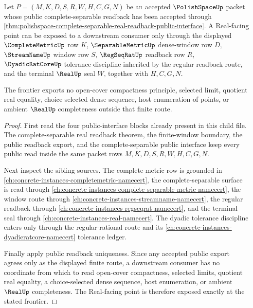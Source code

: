 \begin{theorem}
\label{thm:polishspace-public-complete-separable-real-readback-frontier}
Let $P=(M,K,D,S,R,W,H,C,G,N)$ be an accepted $\PolishSpaceUp$ packet whose public complete-separable readback has been accepted through \autoref{thm:polishspace-complete-separable-real-readback-public-interface}. A Real-facing point can be exposed to a downstream consumer only through the displayed $\CompleteMetricUp$ row $K$, $\SeparableMetricUp$ dense-window row $D$, $\StreamNameUp$ window row $S$, $\RegSeqRatUp$ readback row $R$, $\DyadicRatCoreUp$ tolerance discipline inherited by the regular readback route, and the terminal $\RealUp$ seal $W$, together with $H,C,G,N$.

The frontier exports no open-cover compactness principle, selected limit, quotient real equality, choice-selected dense sequence, host enumeration of points, or ambient $\RealUp$ completeness outside that finite route.
\end{theorem}
\begin{proof}
First read the four public-interface blocks already present in this child file. The complete-separable real readback theorem, the finite-window boundary, the public readback export, and the complete-separable public interface keep every public read inside the same packet rows $M,K,D,S,R,W,H,C,G,N$.

Next inspect the sibling sources. The complete metric row is grounded in \autoref{ch:concrete-instances-completemetric-namecert}, the complete-separable surface is read through \autoref{ch:concrete-instances-complete-separable-metric-namecert}, the window route through \autoref{ch:concrete-instances-streamname-namecert}, the regular readback through \autoref{ch:concrete-instances-regseqrat-namecert}, and the terminal seal through \autoref{ch:concrete-instances-real-namecert}. The dyadic tolerance discipline enters only through the regular-rational route and its \autoref{ch:concrete-instances-dyadicratcore-namecert} tolerance ledger.

Finally apply public readback uniqueness. Since any accepted public export agrees only as the displayed finite route, a downstream consumer has no coordinate from which to read open-cover compactness, selected limits, quotient real equality, a choice-selected dense sequence, host enumeration, or ambient $\RealUp$ completeness. The Real-facing point is therefore exposed exactly at the stated frontier.
\end{proof}
